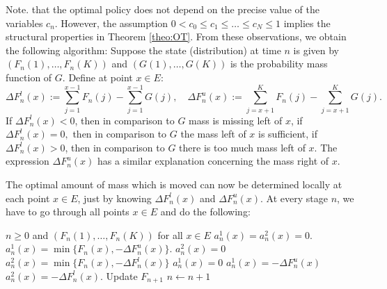 \documentclass[reqno, 12pt]{amsart}%
\theoremstyle{definition}
\numberwithin{equation}{section} \numberwithin{theorem}{section}
\begin{document}
Note. that the optimal policy does not depend on the precise value of the variables $c_n.$ However, the assumption $0<c_0\le c_1 \le \ldots \le c_N\le 1$ implies the structural properties in Theorem \ref{theo:OT}.
From these observations, we obtain the 
following algorithm: Suppose the state 
(distribution) at time $n$ is given by 
$(F_n(1),\ldots,F_n(K))$ and $(G(1),
\ldots,G(K))$ is the probability mass function 
of $G$. Define at point $x\in E:$
$$ \Delta F_n^{l}(x) := \sum_{j=1}^{x-1} 
F_n(j) - \sum_{j=1}^{x-1} G(j), \quad   \Delta 
F_n^{u}(x) := \sum_{j=x+1}^{K} F_n(j) - 
\sum_{j=x+1}^{K} G(j).$$
If $\Delta F_n^{l}(x) <0$, then in comparison 
to $G$ mass is missing left of $x$, if $\Delta 
F_n^{l}(x) =0,$ then  in comparison to $G$ the 
mass left of $x$ is sufficient, if $\Delta 
F_n^{l}(x) >0$, then in comparison to $G$ 
there is too much mass  left of $x$. The 
expression $\Delta F_n^{u}(x)$ has a similar 
explanation concerning the mass right of $x.$

The optimal amount of  mass which is moved can 
now be determined locally  at each point $x\in 
E$, just by knowing $\Delta F_n^{l}(x)$ and $
\Delta F_n^{u}(x).$ At every stage $n$, we 
have to go through all points $x\in E$ and do 
the following:


\begin{algorithm}
\caption{Optimal mass transportation algorithm}\label{alg:cap}
\begin{algorithmic}
\Require $n \geq 0$ and $(F_n(1),\ldots,F_n(K))$ 
 for all $x\in E$
    \State $a_n^1(x)=a_n^2(x)=0.$
 \State $a_n^1(x)=\min\{ F_n(x), -\Delta F_n^{u}(x)\}$.
 \State $a_n^2(x)=0$
    \State $a_n^2(x)=\min\{ F_n(x), -\Delta F_n^{l}(x)\}$
     \State $a_n^1(x)=0$
    \State $a_n^1(x)= -\Delta F_n^{u}(x)$
    \State  $ a_n^2 (x)=-\Delta F_n^{l}(x)$.
\EndIf
\State Update $F_{n+1}$
\State $n \gets n + 1$
\EndWhile
\end{algorithmic}
\end{algorithm}
\end{document}
